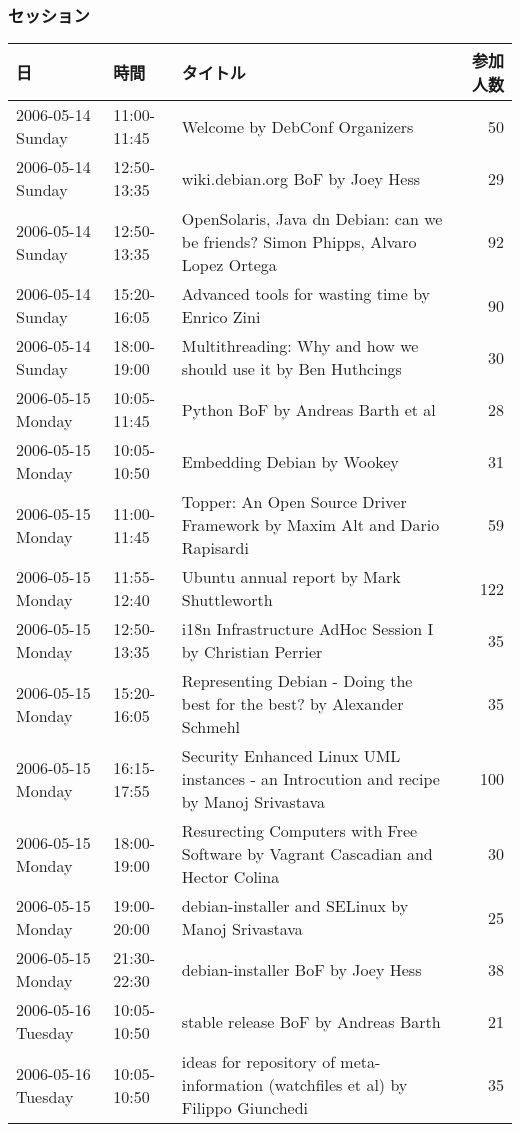 \documentclass[cjk,dvipdfmx]{beamer}
\begin{document}
\begin{frame}
 \frametitle{セッション}
 \begin{center}
 {\tiny
 \begin{tabular}{|l|l|p{20em}|r|}
\hline
日 & 時間 & タイトル & 参加人数 \\
\hline
 2006-05-14 Sunday & 11:00-11:45 & Welcome by DebConf Organizers &  50 \\
 2006-05-14 Sunday & 12:50-13:35 & wiki.debian.org BoF by Joey Hess &  29 \\
 2006-05-14 Sunday & 12:50-13:35 & OpenSolaris, Java dn Debian:  can we be friends? Simon Phipps, Alvaro Lopez Ortega &  92 \\
 2006-05-14 Sunday & 15:20-16:05 & Advanced tools for wasting time by Enrico Zini &  90 \\
 2006-05-14 Sunday & 18:00-19:00 & Multithreading:  Why and how we should use it by Ben Huthcings &  30 \\
 2006-05-15 Monday & 10:05-11:45 & Python BoF by Andreas Barth et al &  28 \\
 2006-05-15 Monday & 10:05-10:50 & Embedding Debian by Wookey &  31 \\
 2006-05-15 Monday & 11:00-11:45 & Topper: An Open Source Driver Framework by Maxim Alt and Dario Rapisardi &  59 \\
 2006-05-15 Monday & 11:55-12:40 & Ubuntu annual report by Mark Shuttleworth &  122 \\
 2006-05-15 Monday & 12:50-13:35 & i18n Infrastructure AdHoc Session I by Christian Perrier &  ~35 \\
 2006-05-15 Monday & 15:20-16:05 & Representing Debian - Doing the best for the best? by Alexander Schmehl &  ~35 \\
 2006-05-15 Monday & 16:15-17:55 & Security Enhanced Linux UML instances - an Introcution and recipe by Manoj Srivastava &  ~100 \\
 2006-05-15 Monday & 18:00-19:00 & Resurecting Computers with Free Software by Vagrant Cascadian and Hector Colina &  30 \\
 2006-05-15 Monday & 19:00-20:00 & debian-installer and SELinux by Manoj Srivastava &  ~25 \\
 2006-05-15 Monday & 21:30-22:30 & debian-installer BoF by Joey Hess &  38 \\
 2006-05-16 Tuesday & 10:05-10:50 & stable release BoF by Andreas Barth &  21 \\
 2006-05-16 Tuesday & 10:05-10:50 & ideas for repository of meta-information (watchfiles et al) by Filippo Giunchedi &  35 \\

\end{tabular}}
\end{center}
\end{frame}
\end{document}
